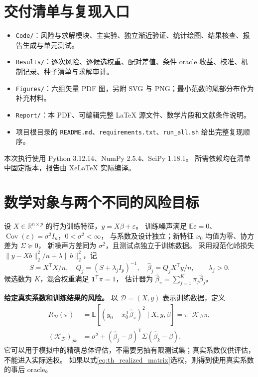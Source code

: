 \documentclass[UTF8,fontset=fandol,11pt,a4paper]{ctexart}
\begin{document}
\section{交付清单与复现入口}
\begin{itemize}
\item \texttt{Code/}：风险与求解模块、主实验、独立渐近验证、统计绘图、结果核查、报告生成与单元测试。
\item \texttt{Results/}：逐次风险、逐候选权重、配对差值、条件 oracle 收益、校准、机制记录、种子清单与求解审计。
\item \texttt{Figures/}：六组矢量 PDF 图，另附 SVG 与 PNG；最小范数的尾部分布作为补充材料。
\item \texttt{Report/}：本 PDF、可编辑完整 \LaTeX{} 源文件、数学片段和文献条件说明。
\item 项目根目录的 \texttt{README.md}、\texttt{requirements.txt}、\texttt{run\_all.sh} 给出完整复现顺序。
\end{itemize}
本次执行使用 Python 3.12.14、NumPy 2.5.4、SciPy 1.18.1。
所需依赖均在清单中固定版本，报告由 XeLaTeX 实际编译。

\clearpage
\appendix
\section{数学对象与两个不同的风险目标}\label{sec:theory_setup}
设 $X\in\mathbb R^{n\times p}$ 的行为训练特征，$y=X\beta+\varepsilon$。
训练噪声满足 $\mathbb E\varepsilon=0$、$\operatorname{Cov}(\varepsilon)=\sigma^2I_n$，$0<\sigma^2<\infty$，
与系数及设计独立；新特征 $x_0$ 均值为零、协方差为 $\Sigma\succeq0$，
新噪声方差同为 $\sigma^2$，且测试点独立于训练数据。
采用规范化岭损失 $\lVert y-Xb\rVert_2^2/n+\lambda\lVert b\rVert_2^2$，记
\begin{equation}\label{eq:th_ridge}
 S=X^{\mathsf T}X/n,\quad Q_j=(S+\lambda_jI_p)^{-1},\quad
 \widehat\beta_j=Q_jX^{\mathsf T}y/n,\qquad \lambda_j>0.
\end{equation}
候选数为 $K$，混合权重满足 $\boldsymbol1^{\mathsf T}\pi=1$，
估计器为 $\widehat\beta_\pi=\sum_{j=1}^K\pi_j\widehat\beta_j$。

\textbf{给定真实系数和训练结果的风险。}
以 $\mathcal D=(X,y)$ 表示训练数据，定义
\begin{align}
 R_{\mathcal D}(\pi)
 &=\mathbb E[(y_0-x_0^{\mathsf T}\widehat\beta_\pi)^2\mid X,y,\beta]
 =\pi^{\mathsf T}\mathcal K_{\mathcal D}\pi,\label{eq:th_realized_risk}\\
 (\mathcal K_{\mathcal D})_{jk}
 &=\sigma^2+(\widehat\beta_j-\beta)^{\mathsf T}\Sigma(\widehat\beta_k-\beta).
 \label{eq:th_realized_matrix}
\end{align}
它可以用于模拟中的精确总体评估，不需要另抽有限测试集；真实系数仅供评估，不能进入实际选权。
如果以式\eqref{eq:th_realized_matrix}选权，则得到使用真实系数的事后 oracle。
\end{document}
